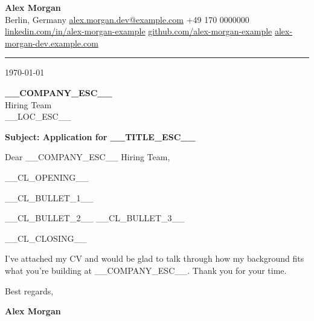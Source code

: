 \documentclass[10.5pt,a4paper]{article}
\begin{document}
\begin{center}
    {\LARGE \textbf{Alex Morgan}}\\[3pt]
    Berlin, Germany \textbar{} \href{mailto:alex.morgan.dev@example.com}{alex.morgan.dev@example.com} \textbar{} +49 170 0000000\\
    \href{https://linkedin.com/in/alex-morgan-example}{linkedin.com/in/alex-morgan-example} \textbar{} \href{https://github.com/alex-morgan-example}{github.com/alex-morgan-example} \textbar{} \href{https://alex-morgan-dev.example.com}{alex-morgan-dev.example.com}
\end{center}

\vspace{4pt}
\hrule
\vspace{12pt}

\today

\vspace{4pt}
\textbf{__COMPANY_ESC__}\\
Hiring Team\\
__LOC_ESC__

\vspace{6pt}
\textbf{Subject: Application for __TITLE_ESC__}

\vspace{2pt}
Dear __COMPANY_ESC__ Hiring Team,

__CL_OPENING__

__CL_BULLET_1__

__CL_BULLET_2__ __CL_BULLET_3__

__CL_CLOSING__

I've attached my CV and would be glad to talk through how my background fits what you're building at __COMPANY_ESC__. Thank you for your time.

\vspace{6pt}
Best regards,

\vspace{8pt}
\textbf{Alex Morgan}
\end{document}
